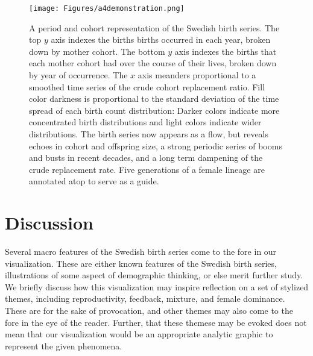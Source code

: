 \documentclass{article}
\begin{document}
\begin{figure}
\texttt{[image: Figures/a4demonstration.png]}
\caption{A period and cohort representation of the Swedish birth series. The top $y$ axis indexes the births births occurred in each year, broken down by mother cohort. The bottom $y$ axis indexes the births that each mother cohort had over the course of their lives, broken down by year of occurrence. The $x$ axis meanders proportional to a smoothed time series of the crude cohort replacement ratio. Fill color darkness is proportional to the standard deviation of the time spread of each birth count distribution: Darker colors indicate more concentrated birth distributions and light colors indicate wider distributions. The birth series now appears as a flow, but reveals echoes in cohort and offspring size, a strong periodic series of booms and busts in recent decades, and a long term dampening of the crude replacement rate. Five generations of a female lineage are annotated atop to serve as a guide.}
\label{fig:foldout}
\end{figure}

\section{Discussion}
\label{sec:disc}
Several macro features of the Swedish birth series come to the fore in our visualization. These are either known features of the Swedish birth series, illustrations of some aspect of demographic thinking, or else merit further study. We briefly discuss how this visualization may inspire reflection on a set of stylized themes, including reproductivity, feedback, mixture, and female dominance. These are for the sake of provocation, and other themes may also come to the fore in the eye of the reader. Further, that these themese may be evoked does not mean that our visualization would be an appropriate analytic graphic to represent the given phenomena.
\end{document}
